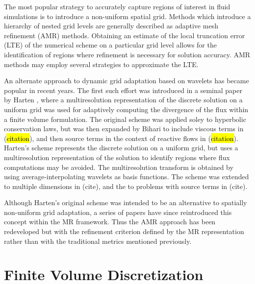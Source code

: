 \documentclass{article}
\begin{document}
    The most popular strategy to accurately capture regions of interest in fluid
    simulations is to introduce a non-uniform spatial grid.  Methods which
    introduce a hierarchy of nested grid levels are generally described as
    adaptive mesh refinement (AMR) methods. Obtaining an estimate of the local
    truncation error (LTE) of the numerical scheme on a particular grid
    level allows for the identification of regions where refinement is necessary
    for solution accuracy. AMR methods may employ several strategies to
    approximate the LTE. 

    An alternate approach to dynamic grid adaptation based on wavelets has became
    popular in recent years. The first such effort was introduced in a seminal
    paper by Harten \cite{harten1994}, where a multiresolution representation of
    the discrete solution on a uniform grid was used for adaptively computing the
    divergence of the flux within a finite volume formulation. The original
    scheme was applied soley to hyperbolic conservation laws, but was then
    expanded by Bihari to include viscous terms in (\hl{citation}), and then source
    terms in the context of reactive flows in (\hl{citation}). Harten's scheme
    represents the discrete solution on a uniform grid, but uses a
    multiresolution representation of the solution to identify regions where
    flux computations may be avoided. The multiresolution transform is obtained
    by using average-interpolating wavelets as basis functions. The scheme was
    extended to multiple dimensions in (cite), and the to problems with source
    terms in (cite).

    Although Harten's original scheme was intended to be an alternative to
    spatially non-uniform grid adaptation, a series of papers have
    since reintroduced this concept within the MR framework. Thus the AMR
    approach has been redeveloped but with the refinement criterion defined by
    the MR representation rather than with the traditional metrics mentioned
    previously.

\section{Finite Volume Discretization}
\end{document}
